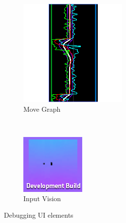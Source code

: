 \begin{figure}[h]
    \centering
    \begin{subfigure}[h]{0.3\textwidth}
        \includegraphics[width=\textwidth]{img/uiGraph.png}
        \caption{Move Graph}
        \label{fig:uigraph}
    \end{subfigure}
    ~ %
    \begin{subfigure}[h]{0.3\textwidth}
        \includegraphics[width=\textwidth]{img/uiVision.png}
        \caption{Input Vision}
        \label{fig:uivision}
    \end{subfigure}
		\caption{Debugging UI elements}
\end{figure}

